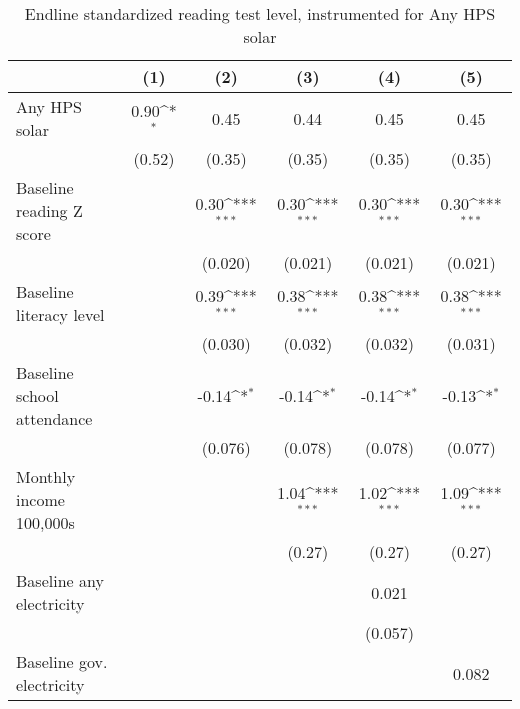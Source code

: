 \begin{table}[htbp]\centering
\def\sym#1{\ifmmode^{#1}\else\(^{#1}\)\fi}
\caption{Endline standardized reading test level, instrumented for Any HPS solar}
\begin{tabular*}{1\hsize}{@{\hskip\tabcolsep\extracolsep\fill}l*{5}{c}}
\toprule
                &\multicolumn{1}{c}{(1)}         &\multicolumn{1}{c}{(2)}         &\multicolumn{1}{c}{(3)}         &\multicolumn{1}{c}{(4)}         &\multicolumn{1}{c}{(5)}         \\
\midrule
Any HPS solar   &     0.90\sym{*}  &     0.45         &     0.44         &     0.45         &     0.45         \\
                &   (0.52)         &   (0.35)         &   (0.35)         &   (0.35)         &   (0.35)         \\
Baseline reading Z score&                  &     0.30\sym{***}&     0.30\sym{***}&     0.30\sym{***}&     0.30\sym{***}\\
                &                  &  (0.020)         &  (0.021)         &  (0.021)         &  (0.021)         \\
Baseline literacy level&                  &     0.39\sym{***}&     0.38\sym{***}&     0.38\sym{***}&     0.38\sym{***}\\
                &                  &  (0.030)         &  (0.032)         &  (0.032)         &  (0.031)         \\
Baseline school attendance&                  &    -0.14\sym{*}  &    -0.14\sym{*}  &    -0.14\sym{*}  &    -0.13\sym{*}  \\
                &                  &  (0.076)         &  (0.078)         &  (0.078)         &  (0.077)         \\
Monthly income 100,000s&                  &                  &     1.04\sym{***}&     1.02\sym{***}&     1.09\sym{***}\\
                &                  &                  &   (0.27)         &   (0.27)         &   (0.27)         \\
Baseline any electricity&                  &                  &                  &    0.021         &                  \\
                &                  &                  &                  &  (0.057)         &                  \\
Baseline gov. electricity&                  &                  &                  &                  &    0.082         \\

\end{tabular*}
\end{table}

